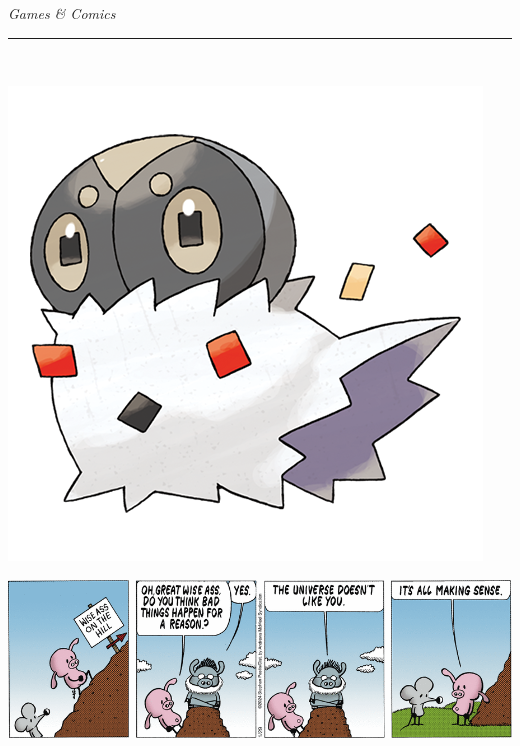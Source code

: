 \documentclass[landscape]{article}
\renewcommand\headline[1]{\begin{center} {\huge \textsl{ #1}}\\ %
			\rule[5pt]{0.8\hsize}{0.5pt}\\ \end{center}}
\begin{document}
\begin{multicols}{3}
\headline{Games \& Comics}
\vspace{-0.4cm}

\noindent\begin{minipage}{0.3\linewidth}
\noindent\includegraphics[width=\linewidth]{images/pokedex.png}
\end{minipage}
\begin{minipage}{0.74\linewidth}

\end{minipage}

\center\includegraphics[width=\linewidth]{images/comic-pearls.png}


\end{multicols}
\end{document}
